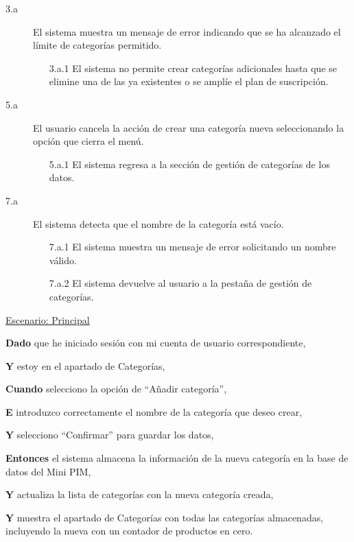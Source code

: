 \begin{description}

    \item[3.a] El sistema muestra un mensaje de error indicando que se ha alcanzado el límite de categorías permitido.
    \begin{enumerate}
        \item[3.a.1] El sistema no permite crear categorías adicionales hasta que se elimine una de las ya existentes o se amplíe el plan de suscripción.
    \end{enumerate}

    \item[5.a] El usuario cancela la acción de crear una categoría nueva seleccionando la opción que cierra el menú.
    \begin{enumerate}
        \item[5.a.1] El sistema regresa a la sección de gestión de categorías de los datos.
    \end{enumerate}

    \item[7.a] El sistema detecta que el nombre de la categoría está vacío.
    \begin{enumerate}
        \item[7.a.1] El sistema muestra un mensaje de error solicitando un nombre válido.
        \item[7.a.2] El sistema devuelve al usuario a la pestaña de gestión de categorías.
    \end{enumerate}
\end{description}

\underline{Escenario: Principal}\par
\vspace{0.15cm}
\textbf{Dado} que he iniciado sesión con mi cuenta de usuario correspondiente,\par
\textbf{Y} estoy en el apartado de Categorías,\par
\textbf{Cuando} selecciono la opción de \enquote{Añadir categoría},\par
\textbf{E} introduzco correctamente el nombre de la categoría que deseo crear,\par
\textbf{Y} selecciono \enquote{Confirmar} para guardar los datos,\par
\textbf{Entonces} el sistema almacena la información de la nueva categoría en la base de datos del Mini PIM,\par
\textbf{Y} actualiza la lista de categorías con la nueva categoría creada,\par
\textbf{Y} muestra el apartado de Categorías con todas las categorías almacenadas, incluyendo la nueva con un contador de productos en cero.\par

